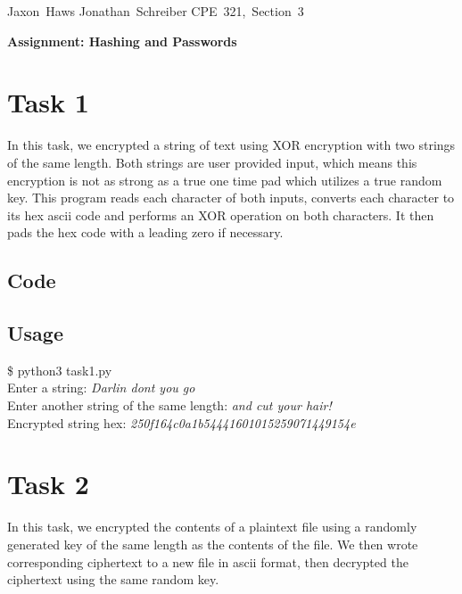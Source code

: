 \documentclass[11pt]{article}
\begin{document}
\hfill\vbox{\hbox{Jaxon Haws}
		\hbox{Jonathan Schreiber}	
		\hbox{CPE 321, Section 3}}\par

\bigskip
\centerline{\Large\bf Assignment: Hashing and Passwords}\par
\bigskip

\section{Task 1}

  In this task, we encrypted a string of text using XOR encryption with two 
  strings of the same length. Both strings are user provided input, which
  means this encryption is not as strong as a true one time pad which utilizes 
  a true random key. 
  This program reads each character of both inputs, converts each character 
  to its hex ascii code and performs an XOR operation on both characters. 
  It then pads the hex code with a leading zero if necessary. 

  \subsection{Code}

  \subsection{Usage}
   
    {\tt\begin{tabbing}                                                                                                                                                                     
       \$ python3 task1.py\\
       Enter a string: {\it Darlin dont you go}\\
       Enter another string of the same length: {\it and cut your hair!} \\
       Encrypted string hex: {\it 250f164c0a1b54441601015259071449154e}\\
      \end{tabbing}}

\section{Task 2}

In this task, we encrypted the contents of a plaintext file using a randomly 
generated key of the same length as the contents of the file. We then wrote
corresponding ciphertext to a new file in ascii format, then decrypted the 
ciphertext using the same random key. 
\end{document}
